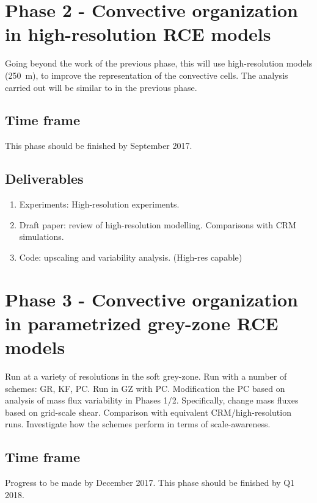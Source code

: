 \documentclass[11pt,a4paper]{article}
\begin{document}
\section*{Phase 2 - Convective organization in high-resolution RCE models}

Going beyond the work of the previous phase, this will use high-resolution models (\SI{250}{m}), to improve the representation of the convective cells. The analysis carried out will be similar to in the previous phase. 

\subsection*{Time frame}

This phase should be finished by September 2017.

\subsection*{Deliverables}
\begin{enumerate}
    \item Experiments: High-resolution experiments.
    \item Draft paper: review of high-resolution modelling. Comparisons with CRM simulations.
    \item Code: upscaling and variability analysis. (High-res capable)
\end{enumerate}

\section*{Phase 3 - Convective organization in parametrized grey-zone RCE models}
Run at a variety of resolutions in the soft grey-zone. Run with a number of schemes: GR, KF, PC. Run in GZ with PC. Modification the PC based on analysis of mass flux variability in Phases 1/2. Specifically, change mass fluxes based on grid-scale shear. Comparison with equivalent CRM/high-resolution runs. Investigate how the schemes perform in terms of scale-awareness.

\subsection*{Time frame}

Progress to be made by December 2017.
This phase should be finished by Q1 2018.
\end{document}
